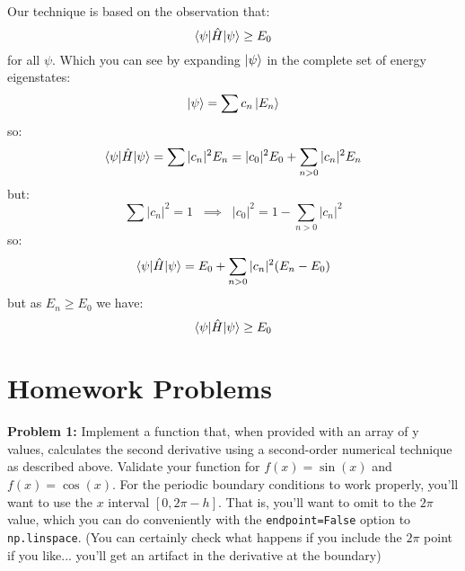\documentclass[12pt]{book}
\begin{document}
Our technique is based on the observation that:
$$\braket{\psi|\hat{H}|\psi} \geq E_0$$
for all $\psi$.  Which you can see by expanding $\ket{\psi}$ in the complete set of energy eigenstates:
$$\ket{\psi} = \sum c_n \ket{E_n}$$
so:
$$\braket{\psi|\hat{H}|\psi} = \sum |c_n|^2 E_n = |c_0|^2 E_0 + \sum_{n>0} |c_n|^2 E_n$$
but:
$$\sum |c_n|^2 = 1 \;\; \implies \;\; |c_0|^2 = 1 - \sum_{n>0} |c_n|^2$$
so:
$$\braket{\psi|\hat{H}|\psi} = E_0 + \sum_{n>0} |c_n|^2 (E_n - E_0)$$
but as $E_n \geq E_0$ we have:
$$\braket{\psi|\hat{H}|\psi} \geq E_0$$

\section{Homework Problems}

\noindent
{\bf Problem 1:}  Implement a function that, when provided with an array of y values, calculates the second derivative using a second-order numerical technique as described above.  Validate your function for $f(x) = \sin(x)$ and $f(x) = \cos(x)$.  For the periodic boundary conditions to work properly, you'll want to use the $x$ interval $[0, 2\pi-h]$.  That is, you'll want to omit to the $2\pi$ value, which you can do conveniently with the {\tt endpoint=False} option to {\tt np.linspace}.  (You can certainly check what happens if you include the $2\pi$ point if you like... you'll get an artifact in the derivative at the boundary)
\end{document}
